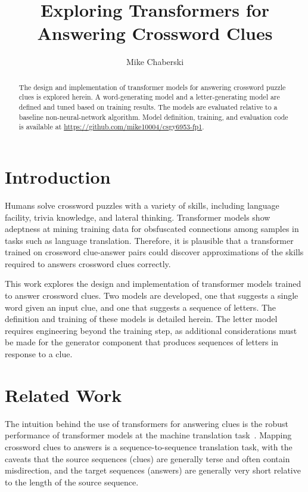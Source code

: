 \documentclass[letterpaper]{article} %
\title{Exploring Transformers for Answering Crossword Clues}
\author {
    Mike Chaberski
}
\begin{document}
\maketitle

\begin{abstract}
    The design and implementation of transformer models for answering crossword puzzle clues is explored herein.
    A word-generating model and a letter-generating model are defined and tuned based on training results.
    The models are evaluated relative to a baseline non-neural-network algorithm.
    Model definition, training, and evaluation code is available at \url{https://github.com/mike10004/csgy6953-fp1}.
\end{abstract}

\begin{NoHyper}

\section{Introduction}
\label{sec:intro}

Humans solve crossword puzzles with a variety of skills, including language facility, trivia knowledge, and lateral thinking.
Transformer models show adeptness at mining training data for obsfuscated connections among samples in tasks such as language translation.
Therefore, it is plausible that a transformer trained on crossword clue-answer pairs could discover approximations of the
skills required to answers crossword clues correctly.

This work explores the design and implementation of transformer models trained to answer crossword clues.
Two models are developed, one that suggests a single word given an input clue, and one that suggests a
sequence of letters.
The definition and training of these models is detailed herein.
The letter model requires engineering beyond the training step, as
additional considerations must be made for the generator component that produces
sequences of letters in response to a clue.

\section{Related Work}
\label{sec:related}

The intuition behind the use of transformers for answering clues is the robust performance of transformer models at
the machine translation task~\cite{vaswani2017}.
Mapping crossword clues to answers is a sequence-to-sequence translation task, with the caveats that the source
sequences (clues) are generally terse and often contain misdirection, and the target sequences (answers) are
generally very short relative to the length of the source sequence.


\end{NoHyper}
\end{document}

